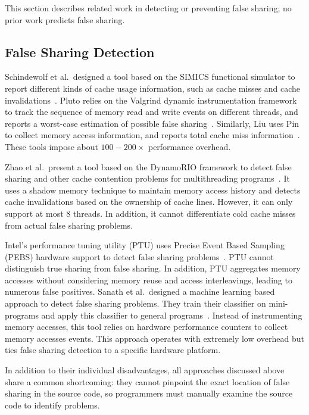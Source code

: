 \label{sec:relatedwork}

This section describes related work in detecting or preventing false sharing; no prior work predicts false sharing.

\subsection{False Sharing Detection}
Schindewolf et al.\ designed a tool based on the SIMICS functional simulator to report different kinds of cache usage information, such as cache misses and cache invalidations~\cite{falseshare:simulator}. Pluto relies on the Valgrind dynamic instrumentation framework to track the sequence of memory read and write events on different threads, and reports a worst-case estimation of possible false sharing~\cite{falseshare:binaryinstrumentation1}.
Similarly, Liu uses Pin to collect memory access information, and reports total cache miss information~\cite{falseshare:binaryinstrumentation2}.
These tools impose about $100-200\times$ performance overhead.

Zhao et al.\ present a tool based on the DynamoRIO framework to detect false sharing and other cache contention problems
for multithreading programs~\cite{qinzhaodetection}. 
It uses a shadow memory technique to maintain memory access history and detects cache invalidations based on the ownership of cache lines. However, it can only support at most $8$ threads. In addition, it cannot differentiate cold cache misses from actual false sharing problems.

Intel's performance tuning utility (PTU) uses Precise Event Based Sampling (PEBS) hardware support to detect false sharing problems~\cite{detect:ptu,detect:intel}.  PTU cannot distinguish true sharing from false sharing. In addition, PTU aggregates memory accesses without considering memory reuse and access interleavings, leading to numerous false positives. Sanath et al.\ designed a machine learning based approach to detect false sharing problems. They train their classifier on mini-programs and apply this classifier to general programs~\cite{mldetect}. Instead of instrumenting memory accesses, this tool relies on hardware performance counters to collect memory accesses events. This approach operates with extremely low overhead but ties false sharing detection to a specific hardware platform.

In addition to their individual disadvantages,
all approaches discussed above share a common shortcoming:  
they cannot pinpoint the exact location of false sharing in the source code, so programmers must manually examine the source code to identify problems.

